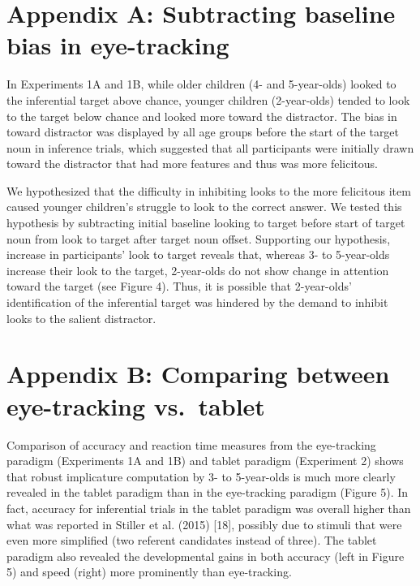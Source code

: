 \documentclass{rsos}
\begin{document}

\section*{Appendix A: Subtracting baseline bias in
eye-tracking}\label{appendix-a-subtracting-baseline-bias-in-eye-tracking}

In Experiments 1A and 1B, while older children (4- and 5-year-olds)
looked to the inferential target above chance, younger children
(2-year-olds) tended to look to the target below chance and looked more
toward the distractor. The bias in toward distractor was displayed by
all age groups before the start of the target noun in inference trials,
which suggested that all participants were initially drawn toward the
distractor that had more features and thus was more felicitous.

We hypothesized that the difficulty in inhibiting looks to the more
felicitous item caused younger children's struggle to look to the
correct answer. We tested this hypothesis by subtracting initial
baseline looking to target before start of target noun from look to
target after target noun offset. Supporting our hypothesis, increase in
participants' look to target reveals that, whereas 3- to 5-year-olds
increase their look to the target, 2-year-olds do not show change in
attention toward the target (see Figure 4). Thus, it is possible that
2-year-olds' identification of the inferential target was hindered by
the demand to inhibit looks to the salient distractor.

\section*{Appendix B: Comparing between eye-tracking
vs.~tablet}\label{appendix-b-comparing-between-eye-tracking-vs.tablet}

Comparison of accuracy and reaction time measures from the eye-tracking
paradigm (Experiments 1A and 1B) and tablet paradigm (Experiment 2)
shows that robust implicature computation by 3- to 5-year-olds is much
more clearly revealed in the tablet paradigm than in the eye-tracking
paradigm (Figure 5). In fact, accuracy for inferential trials in the
tablet paradigm was overall higher than what was reported in Stiller et
al. (2015) {[}18{]}, possibly due to stimuli that were even more simplified (two
referent candidates instead of three). The tablet paradigm also revealed
the developmental gains in both accuracy (left in Figure 5) and speed
(right) more prominently than eye-tracking.
\end{document}
